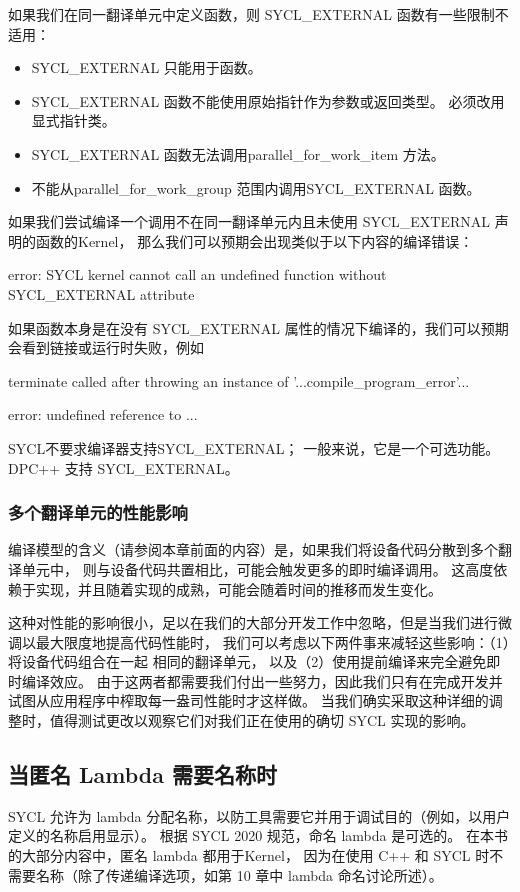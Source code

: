 如果我们在同一翻译单元中定义函数，则 SYCL\_EXTERNAL 函数有一些限制不适用：

\begin{itemize}
	\item SYCL\_EXTERNAL 只能用于函数。

	\item SYCL\_EXTERNAL 函数不能使用原始指针作为参数或返回类型。 必须改用显式指针类。

	\item SYCL\_EXTERNAL 函数无法调用parallel\_for\_work\_item 方法。

	\item 不能从parallel\_for\_work\_group 范围内调用SYCL\_EXTERNAL 函数。
\end{itemize}

如果我们尝试编译一个调用不在同一翻译单元内且未使用 SYCL\_EXTERNAL 声明的函数的Kernel，
那么我们可以预期会出现类似于以下内容的编译错误：

error: SYCL kernel cannot call an undefined function without SYCL\_EXTERNAL attribute

如果函数本身是在没有 SYCL\_EXTERNAL 属性的情况下编译的，我们可以预期会看到链接或运行时失败，例如

terminate called after throwing an instance of '...compile\_program\_error'...

error: undefined reference to ...

SYCL不要求编译器支持SYCL\_EXTERNAL； 一般来说，它是一个可选功能。 DPC++ 支持 SYCL\_EXTERNAL。

\subsubsection{多个翻译单元的性能影响}
编译模型的含义（请参阅本章前面的内容）是，如果我们将设备代码分散到多个翻译单元中，
则与设备代码共置相比，可能会触发更多的即时编译调用。 
这高度依赖于实现，并且随着实现的成熟，可能会随着时间的推移而发生变化。

这种对性能的影响很小，足以在我们的大部分开发工作中忽略，但是当我们进行微调以最大限度地提高代码性能时，
我们可以考虑以下两件事来减轻这些影响：（1）将设备代码组合在一起 相同的翻译单元，
以及（2）使用提前编译来完全避免即时编译效应。 
由于这两者都需要我们付出一些努力，因此我们只有在完成开发并试图从应用程序中榨取每一盎司性能时才这样做。 
当我们确实采取这种详细的调整时，值得测试更改以观察它们对我们正在使用的确切 SYCL 实现的影响。

\subsection{当匿名 Lambda 需要名称时}
SYCL 允许为 lambda 分配名称，以防工具需要它并用于调试目的（例如，以用户定义的名称启用显示）。 
根据 SYCL 2020 规范，命名 lambda 是可选的。 
在本书的大部分内容中，匿名 lambda 都用于Kernel，
因为在使用 C++ 和 SYCL 时不需要名称（除了传递编译选项，如第 10 章中 lambda 命名讨论所述）。

